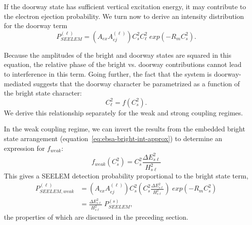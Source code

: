 If the doorway state has sufficient vertical excitation energy,
it may contribute
to the electron ejection probability. We turn now to derive an
intensity distribution for the doorway term
\begin{equation}
  P_{SEELEM}^{(\ell)} = \left( A_{ex} A_{ej}^{(\ell)} \right) 
    C_s^2 C_\ell^2 \; exp \left( -R_m C_s^2 \right).
\end{equation}

Because the amplitudes of the bright and doorway states are squared in
this equation, the relative phase of the bright vs. doorway
contributions cannot lead to interference in this term. Going further, the
fact that the system is doorway-mediated suggests that the doorway
character be parametrized as a function of the bright state
character:
\begin{equation}
  C_{\ell}^2 = f(C_s^2).
\end{equation}
We derive this relationship separately for the weak and strong
coupling regimes.

In the weak coupling regime, we can invert the results from the
embedded bright state arrangement
(equation~\ref{eq:ebsa-bright-int-approx}) to determine an expression
for $f_{weak}$:
\begin{equation}
  f_{weak} \left ( C_s^2 \right ) = C_s^2 \frac{\Delta E_{s\ell}^2}{H_{s\ell}^2}
\end{equation}
This gives a SEELEM detection probability proportional to the bright
state term,
\begin{equation}
  \begin{split}
    P_{SEELEM, weak}^{(\ell)} &= 
    \left( A_{ex} A_{ej}^{(\ell)} \right) 
    C_s^2 \left ( C_s^2 \frac{\Delta E_{s\ell}^2}{H_{s\ell}^2} \right )
    \; exp \left( -R_m C_s^2 \right)\\
    &= \frac{\Delta E_{s\ell}^2}{H_{s\ell}^2} \; P_{SEELEM}^{(s)},
  \end{split}
\end{equation}
the properties of which are discussed in the preceding section.

